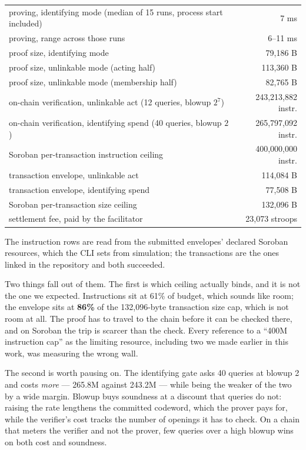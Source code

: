 \documentclass[11pt,a4paper]{article}
\begin{document}
\begin{center}
\begin{tabular}{@{}lr@{}}
\toprule
proving, identifying mode (median of 15 runs, process start included) & 7 ms \\
proving, range across those runs & 6--11 ms \\
proof size, identifying mode & 79{,}186 B \\
proof size, unlinkable mode (acting half) & 113{,}360 B \\
proof size, unlinkable mode (membership half) & 82{,}765 B \\
on-chain verification, unlinkable act (12 queries, blowup $2^7$) & 243{,}213{,}882 instr. \\
on-chain verification, identifying spend (40 queries, blowup $2$) & 265{,}797{,}092 instr. \\
Soroban per-transaction instruction ceiling & 400{,}000{,}000 instr. \\
transaction envelope, unlinkable act & 114{,}084 B \\
transaction envelope, identifying spend & 77{,}508 B \\
Soroban per-transaction size ceiling & 132{,}096 B \\
settlement fee, paid by the facilitator & 23{,}073 stroops \\
\bottomrule
\end{tabular}
\end{center}

The instruction rows are read from the submitted envelopes' declared Soroban
resources, which the CLI sets from simulation; the transactions are the ones
linked in the repository and both succeeded.

Two things fall out of them. The first is which ceiling actually binds, and it
is not the one we expected. Instructions sit at 61\% of budget, which sounds
like room; the envelope sits at \textbf{86\%} of the 132{,}096-byte transaction
size cap, which is not room at all. The proof has to travel to the chain before
it can be checked there, and on Soroban the trip is scarcer than the check.
Every reference to a ``400M instruction cap'' as the limiting resource,
including two we made earlier in this work, was measuring the wrong wall.

The second is worth pausing on. The identifying gate asks 40 queries at blowup 2
and costs \emph{more} --- 265.8M against 243.2M --- while being the weaker of
the two by a wide margin. Blowup buys soundness at a discount that queries do
not: raising the rate lengthens the committed codeword, which the prover pays
for, while the verifier's cost tracks the number of openings it has to check. On
a chain that meters the verifier and not the prover, few queries over a high
blowup wins on both cost and soundness.
\end{document}
